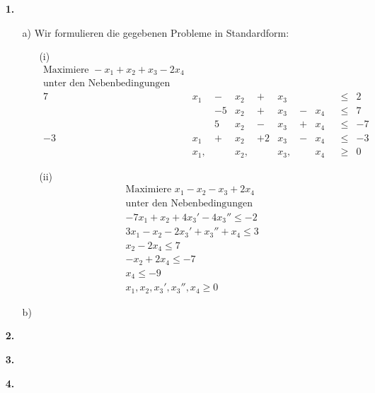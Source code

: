 \documentclass [a4paper,11pt]{article}
\author{\authorinfotitle}
\title{\titleinfo}
\date{\today}
\begin{document}
\maketitle
    \begin{enumerate}
        \item[\textbf{1.}]
            \begin{enumerate}
                \item[a)]
                    Wir formulieren die gegebenen Probleme in Standardform:
                    \begin{enumerate}
                        \item[(i)]
                            \begin{align*}
                                \text{Maximiere } -x_1 + x_2 + x_3 - 2x_4 \\
                                \text{unter den Nebenbedingungen}\\
                                7&x_1& - &x_2& + &x_3& && &\leq& 2\\
                                && -5&x_2& + &x_3& - &x_4& &\leq& 7\\
                                && 5&x_2& - &x_3& + &x_4& &\leq& -7\\
                                -3&x_1& + &x_2& + 2&x_3& - &x_4& &\leq& -3\\
                                &x_1,&&x_2,&&x_3,&&x_4& &\geq& 0
                            \end{align*}
                        \item[(ii)]
                            \begin{align*}
                                \text{Maximiere } x_1 - x_2 - x_3 +2x_4\\
                                \text{unter den Nebenbedingungen}\\
                                -7x_1 + x_2 + 4x_3' - 4x_3'' \leq -2\\
                                3x_1 - x_2 - 2x_3' + x_3'' + x_4 \leq 3\\
                                x_2 - 2x_4 \leq 7\\
                                -x_2 + 2x_4 \leq -7\\
                                x_4 \leq -9\\
                                x_1,x_2,x_3',x_3'',x_4 \geq 0
                            \end{align*}
                    \end{enumerate}
                \item[b)]
            \end{enumerate}
        \item[\textbf{2.}]

        \item[\textbf{3.}]

        \item[\textbf{4.}]
            
            

    \end{enumerate}
\end{document}
